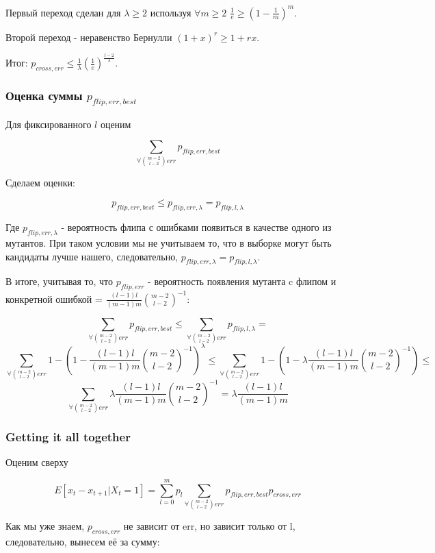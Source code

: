 \documentclass{article}
\begin{document}
Первый переход сделан для $\lambda \geq 2$ используя $\forall m \geq 2$  $\frac{1}{e} \geq (1 - \frac{1}{m})^m$.

Второй переход - неравенство Бернулли ${(1+x)^r \geq 1 + rx}$.

Итог: $p_{cross, err} \leq \frac{1}{\lambda}(\frac{1}{e})^\frac{l - 2}{\lambda}$.


  \subsubsection{Оценка суммы $p_{flip, err, best}$}

Для фиксированного $l$ оценим

$$
\sum_{\forall \binom{m - 2}{l - 2} err} p_{flip, err, best}
$$

Сделаем оценки:

$$
p_{flip, err, best} \leq p_{flip, err, \lambda} = p_{flip, l,  \lambda}
$$

Где $p_{flip, err, \lambda}$ - вероятность флипа с ошибками появиться в качестве одного из мутантов. При таком условии мы не учитываем то, что в выборке могут быть кандидаты лучше нашего, следовательно, $p_{flip, err, \lambda} = p_{flip, l,  \lambda}$.

В итоге, учитывая то, что $p_{flip, err}$ - вероятность появления мутанта c флипом и конкретной ошибкой = $\frac{(l - 1)l}{(m - 1)m}\binom{m - 2}{l - 2}^{-1}$:

$$
\sum_{\forall \binom{m - 2}{l - 2} err} p_{flip, err, best} \leq 
\sum_{\forall \binom{m - 2}{l - 2} err} p_{flip, l,  \lambda} =
$$
$$
\sum_{\forall \binom{m - 2}{l - 2} err} 1 - (1 - \frac{(l - 1)l}{(m - 1)m}\binom{m - 2}{l - 2}^{-1})^\lambda \leq
\sum_{\forall \binom{m - 2}{l - 2} err} 1 - (1 - \lambda\frac{(l - 1)l}{(m - 1)m}\binom{m - 2}{l - 2}^{-1}) \leq
$$
$$
\sum_{\forall \binom{m - 2}{l - 2} err} \lambda\frac{(l - 1)l}{(m - 1)m}\binom{m - 2}{l - 2}^{-1}  = 
\lambda\frac{(l - 1)l}{(m - 1)m}
$$

  \subsubsection{Getting it all together}

Оценим сверху 

$$
E[x_t - x_{t+1} | X_t = 1] = \sum_{l=0}^{m} p_l \sum_{\forall \binom{m - 2}{l - 2} err} p_{flip, err, best} p_{cross, err}
$$

Как мы уже знаем, $p_{cross, err}$ не зависит от err, но зависит только от l, следовательно, вынесем её за сумму:
\end{document}
